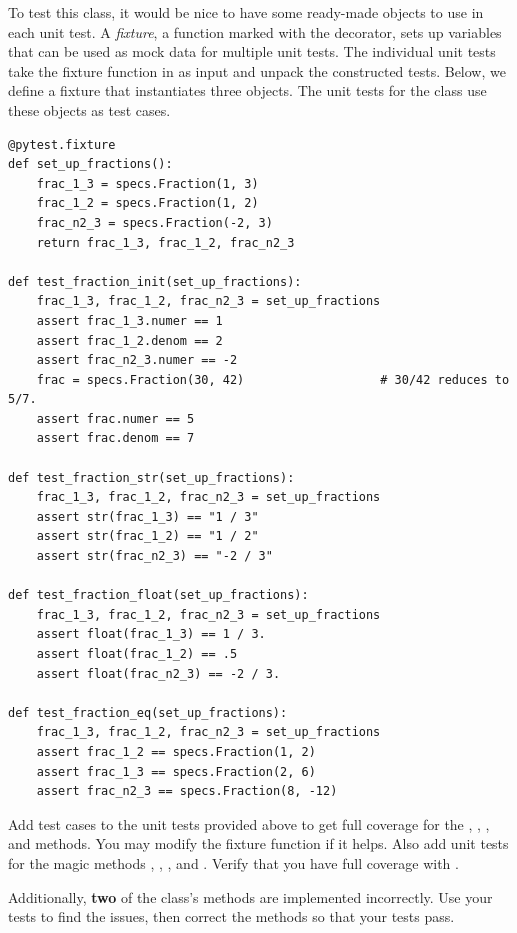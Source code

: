 To test this class, it would be nice to have some ready-made  objects to use in each unit test.
A \emph{fixture}, a function marked with the  decorator, sets up variables that can be used as mock data for multiple unit tests.
The individual unit tests take the fixture function in as input and unpack the constructed tests.
Below, we define a fixture that instantiates three  objects.
The unit tests for the  class use these objects as test cases.

\begin{lstlisting}
@pytest.fixture
def set_up_fractions():
    frac_1_3 = specs.Fraction(1, 3)
    frac_1_2 = specs.Fraction(1, 2)
    frac_n2_3 = specs.Fraction(-2, 3)
    return frac_1_3, frac_1_2, frac_n2_3

def test_fraction_init(set_up_fractions):
    frac_1_3, frac_1_2, frac_n2_3 = set_up_fractions
    assert frac_1_3.numer == 1
    assert frac_1_2.denom == 2
    assert frac_n2_3.numer == -2
    frac = specs.Fraction(30, 42)                   # 30/42 reduces to 5/7.
    assert frac.numer == 5
    assert frac.denom == 7

def test_fraction_str(set_up_fractions):
    frac_1_3, frac_1_2, frac_n2_3 = set_up_fractions
    assert str(frac_1_3) == "1 / 3"
    assert str(frac_1_2) == "1 / 2"
    assert str(frac_n2_3) == "-2 / 3"

def test_fraction_float(set_up_fractions):
    frac_1_3, frac_1_2, frac_n2_3 = set_up_fractions
    assert float(frac_1_3) == 1 / 3.
    assert float(frac_1_2) == .5
    assert float(frac_n2_3) == -2 / 3.

def test_fraction_eq(set_up_fractions):
    frac_1_3, frac_1_2, frac_n2_3 = set_up_fractions
    assert frac_1_2 == specs.Fraction(1, 2)
    assert frac_1_3 == specs.Fraction(2, 6)
    assert frac_n2_3 == specs.Fraction(8, -12)
\end{lstlisting}

\begin{problem}
Add test cases to the unit tests provided above to get full coverage for the , , , and  methods.
You may modify the fixture function if it helps.
Also add unit tests for the magic methods , , , and .
Verify that you have full coverage with .

Additionally, \textbf{two} of the  class's methods are implemented incorrectly.
Use your tests to find the issues, then correct the methods so that your tests pass.
\end{problem}

